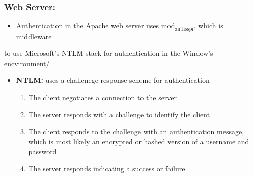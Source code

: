 \documentclass[11pt]{article}
\begin{document}
\subsubsection{Web Server:}
\label{sec-3-2-1}
\begin{itemize}
\item Authentication in the Apache web server uses mod$_{\text{auth}}$$_{\text{sspi}}$, which is middleware
\end{itemize}
to use Microsoft's NTLM stack for authentication in the Window's encvironment/
\begin{itemize}
\item \textbf{NTLM:} uses a challenege response scheme for authentication
\begin{enumerate}
\item The client negotiates a connection to the server
\item The server responds with a challenge to identify the client
\item The client responds to the challenge with an authentication message, which
is most likely an encrypted or hashed version of a username and password.
\item The server responds indicating a success or failure.
\end{enumerate}
\end{itemize}
\end{document}
